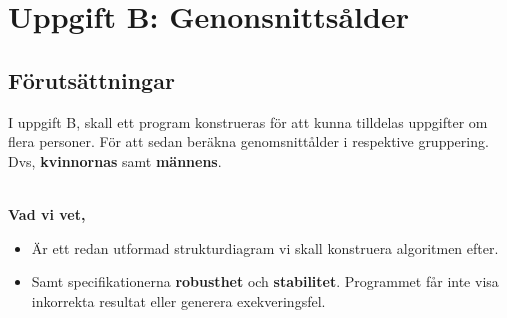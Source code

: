 \documentclass[../main.tex]{subfiles}
\begin{document}
\section{Uppgift B: Genonsnittsålder}

\subsection{Förutsättningar}

I uppgift B, skall ett program konstrueras för att kunna tilldelas uppgifter om flera personer. För att sedan beräkna genomsnittålder i respektive gruppering.\\
Dvs, \textbf{kvinnornas} samt \textbf{männens}.\\
\\
\begin{tcolorbox}[colback=gray!5!white,colframe=black!75!black]

\textbf{Vad vi vet,} 

\begin{itemize}

    \item Är ett redan utformad strukturdiagram vi skall konstruera algoritmen efter. 
    
    \item Samt specifikationerna \textbf{robusthet} och \textbf{stabilitet}.
    Programmet får inte visa inkorrekta resultat eller generera exekveringsfel.
    
\end{itemize}

\end{tcolorbox}

\newpage
\end{document}
